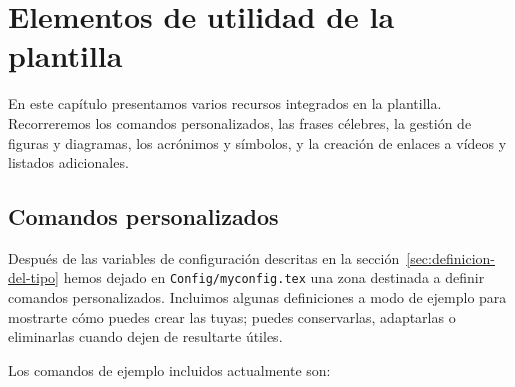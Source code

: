 %

\chapter{Elementos de utilidad de la plantilla}
\label{cha:elementos-utilidad}

En este capítulo presentamos varios recursos integrados en la plantilla. Recorreremos los comandos personalizados, las frases célebres, la gestión de figuras y diagramas, los acrónimos y símbolos, y la creación de enlaces a vídeos y listados adicionales.

\section{Comandos personalizados}
\label{sec:uso-de-comandos}

Después de las variables de configuración descritas en la sección~\ref{sec:definicion-del-tipo} hemos dejado en \texttt{Config/myconfig.tex} una zona destinada a definir comandos personalizados. Incluimos algunas definiciones a modo de ejemplo para mostrarte cómo puedes crear las tuyas; puedes conservarlas, adaptarlas o eliminarlas cuando dejen de resultarte útiles.

Los comandos de ejemplo incluidos actualmente son:

